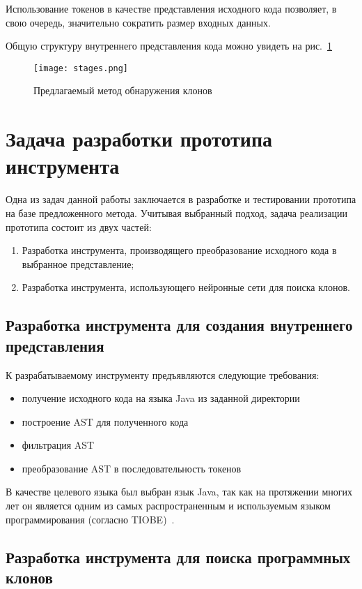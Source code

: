 Использование токенов в качестве представления исходного кода позволяет, в свою очередь, значительно сократить размер входных данных.

Общую структуру внутреннего представления кода можно увидеть на рис.~\ref{fig:stages}

\begin{figure}[htbp]
\centering
\texttt{[image: stages.png]}
\caption{Предлагаемый метод обнаружения клонов}
\label{fig:stages}
\end{figure}

\section{Задача разработки прототипа инструмента}

Одна из задач данной работы заключается в разработке и тестировании прототипа на базе предложенного метода. Учитывая выбранный подход, задача реализации прототипа состоит из двух частей:
\begin{enumerate}
\item Разработка инструмента, производящего преобразование исходного кода в выбранное представление;
\item Разработка инструмента, использующего нейронные сети для поиска клонов.
\end{enumerate}

\subsection{Разработка инструмента для создания внутреннего представления}

К разрабатываемому инструменту предъявляются следующие требования:
\begin{itemize}
\setlength\itemsep{0mm}
\item получение исходного кода на языка Java из заданной директории
\item построение AST для полученного кода
\item фильтрация AST
\item преобразование AST в последовательность токенов
\end{itemize}

В качестве целевого языка был выбран язык Java, так как на протяжении многих лет он является одним из самых распространенным и используемым языком программирования (согласно TIOBE)~\cite{TIOBE}. 

\subsection{Разработка инструмента для поиска программных клонов}


